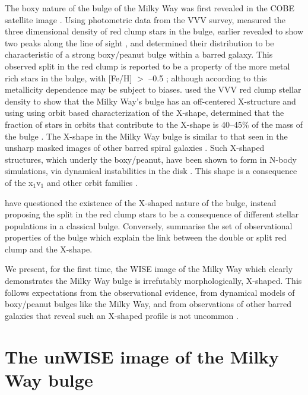 \documentclass[12pt, preprint]{aastex}
\begin{document}
The boxy nature of the bulge of the Milky Way was first revealed in
the COBE satellite image \citep{Dwek1995}. Using photometric data from
the VVV survey, \citet{Wegg2013} measured the three dimensional
density of red clump stars in the bulge, earlier revealed to show two
peaks along the line of sight \citep{McWilliam2010, Nataf2010}, and
determined their distribution to be characteristic of a strong
boxy/peanut bulge within a barred galaxy. This observed split in the
red clump is reported to be a property of the more metal rich stars in
the bulge, with [Fe/H] $>$ --0.5 \citep{Ness2012, Uttenthaler2012};
although according to \citet{Nataf2014} this metallicity dependence
may be subject to biases.  \citet{Portail2015a} used the VVV red clump
stellar density to show that the Milky Way's bulge has an off-centered
X-structure and using using orbit based characterization of the
X-shape, determined that the fraction of stars in orbits that
contribute to the X-shape is 40--45\% of the mass of the bulge
\citep{Portail2015b}. The X-shape in the Milky Way bulge is similar to
that seen in the unsharp masked images of other barred spiral galaxies
\citep[e.g.][]{Bureau2006}. Such X-shaped structures, which underly
the boxy/peanut, have been shown to form in N-body simulations, via
dynamical instabilities in the disk \citep[e.g.][]{Athanassoula2005,
  Debattista2006, Inma2006}. This shape is a consequence of the
x$_{1}$v$_{1}$ \citep{P1984, Athanassoula1992} and other orbit
families \citep[e.g.][]{Portail2015b}.

\citet{Lee2015} have questioned the existence of the X-shaped nature of the bulge, instead proposing the split in the red clump stars to be a consequence of different stellar populations in a classical bulge. Conversely,  \citet{Gonzalez2015} summarise the set of observational properties of the bulge which explain the link between the double or split red clump and the X-shape.


 We present, for the first time, the WISE image of the Milky Way \citep{Lang2014a} which clearly demonstrates the Milky Way bulge is irrefutably morphologically, X-shaped. This follows expectations from the observational evidence,  from dynamical models of boxy/peanut bulges like the Milky Way, and from observations of other barred galaxies that reveal such an X-shaped profile is not uncommon \citep{L2014}. 

\section{The unWISE image of the Milky Way bulge}
\end{document}
